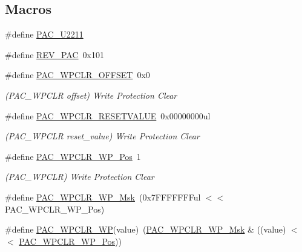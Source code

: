 \subsection*{Macros}
\begin{DoxyCompactItemize}
\item 
\#define \mbox{\hyperlink{group___s_a_m_d21___p_a_c_ga7b4542fab3fb2b084f233d3c19ce583f}{P\+A\+C\+\_\+\+U2211}}
\item 
\#define \mbox{\hyperlink{group___s_a_m_d21___p_a_c_gae5cdafc1f439a00abc501cacc09f6013}{R\+E\+V\+\_\+\+P\+AC}}~0x101
\item 
\#define \mbox{\hyperlink{group___s_a_m_d21___p_a_c_gaa8bfe2dbd850c149b544388e5e66c047}{P\+A\+C\+\_\+\+W\+P\+C\+L\+R\+\_\+\+O\+F\+F\+S\+ET}}~0x0
\begin{DoxyCompactList}\small\item\em (P\+A\+C\+\_\+\+W\+P\+C\+LR offset) Write Protection Clear \end{DoxyCompactList}\item 
\#define \mbox{\hyperlink{group___s_a_m_d21___p_a_c_ga7e4471c2307dc62051413a92921e9ad3}{P\+A\+C\+\_\+\+W\+P\+C\+L\+R\+\_\+\+R\+E\+S\+E\+T\+V\+A\+L\+UE}}~0x00000000ul
\begin{DoxyCompactList}\small\item\em (P\+A\+C\+\_\+\+W\+P\+C\+LR reset\+\_\+value) Write Protection Clear \end{DoxyCompactList}\item 
\#define \mbox{\hyperlink{group___s_a_m_d21___p_a_c_gac893a3965fb3e10c9adeef5f32aaa077}{P\+A\+C\+\_\+\+W\+P\+C\+L\+R\+\_\+\+W\+P\+\_\+\+Pos}}~1
\begin{DoxyCompactList}\small\item\em (P\+A\+C\+\_\+\+W\+P\+C\+LR) Write Protection Clear \end{DoxyCompactList}\item 
\#define \mbox{\hyperlink{group___s_a_m_d21___p_a_c_gac859179771238c92c152314627e75b60}{P\+A\+C\+\_\+\+W\+P\+C\+L\+R\+\_\+\+W\+P\+\_\+\+Msk}}~(0x7\+F\+F\+F\+F\+F\+F\+Ful $<$$<$ P\+A\+C\+\_\+\+W\+P\+C\+L\+R\+\_\+\+W\+P\+\_\+\+Pos)
\item 
\#define \mbox{\hyperlink{group___s_a_m_d21___p_a_c_gabb1641cc411ee007d063770088b81193}{P\+A\+C\+\_\+\+W\+P\+C\+L\+R\+\_\+\+WP}}(value)~(\mbox{\hyperlink{group___s_a_m_d21___p_a_c_gac859179771238c92c152314627e75b60}{P\+A\+C\+\_\+\+W\+P\+C\+L\+R\+\_\+\+W\+P\+\_\+\+Msk}} \& ((value) $<$$<$ \mbox{\hyperlink{group___s_a_m_d21___p_a_c_gac893a3965fb3e10c9adeef5f32aaa077}{P\+A\+C\+\_\+\+W\+P\+C\+L\+R\+\_\+\+W\+P\+\_\+\+Pos}}))

\end{DoxyCompactItemize}
